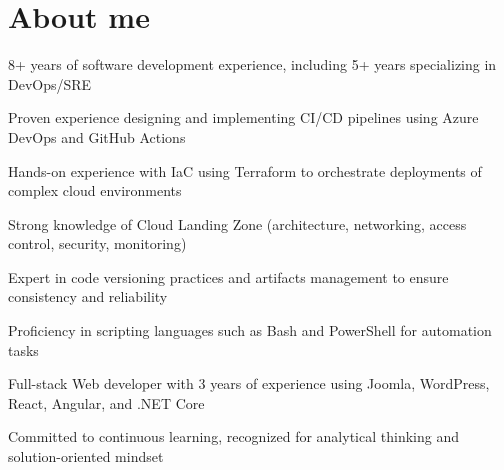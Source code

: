 \documentclass[]{deedy-resume-openfont}
\begin{document}
    
%
%
%
%
\sectionsep
\sectionsep
\section{About me}
\vspace{5pt}
\begin{tightemize}
	\item 8+ years of software development experience, including 5+ years specializing in DevOps/SRE
	\item Proven experience designing and implementing CI/CD pipelines using Azure DevOps and GitHub Actions
	\item Hands-on experience with IaC using Terraform to orchestrate deployments of complex cloud environments
	\item Strong knowledge of Cloud Landing Zone (architecture, networking, access control, security, monitoring)
	\item Expert in code versioning practices and artifacts management to ensure consistency and reliability
	\item Proficiency in scripting languages such as Bash and PowerShell for automation tasks
	\item Full-stack Web developer with 3 years of experience using Joomla, WordPress, React, Angular, and .NET Core
	\item Committed to continuous learning, recognized for analytical thinking and solution-oriented mindset
\end{tightemize}
%
%
\end{document}
